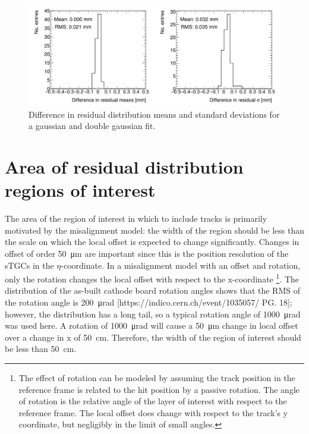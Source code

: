 \begin{figure}
    \centering
    \includegraphics[width = \textwidth]{figures/figure_compare_residual_fits_QL2C04_2900V_2021-02-08_2_fit_range_mean_pm_RMS_minus_quick_and_dirty_2900V_log_scale_layer1_fixedlayers34.png}
    \caption{Difference in residual distribution means and standard deviations for a gaussian and double gaussian fit.}
    \label{fig:double_gaussian_compare_fits}
\end{figure}

\section{Area of residual distribution regions of interest}
\label{appendix:systematics_bin_size}


The area of the region of interest in which to include tracks is primarily motivated by the misalignment model: the width of the region should be less than the scale on which the local offset is expected to change significantly. Changes in offset of order \SI{50}{\micro\meter} are important since this is the position resolution of the sTGCs in the $\eta$-coordinate. In a misalignment model with an offset and rotation, only the rotation changes the local offset with respect to the x-coordinate \footnote{The effect of rotation can be modeled by assuming the track position in the reference frame is related to the hit position by a passive rotation. The angle of rotation is the relative angle of the layer of interest with respect to the reference frame. The local offset does change with respect to the track's y coordinate, but negligibly in the limit of small angles.}.  The distribution of the as-built cathode board rotation angles shows that the RMS of the rotation angle is \SI{200}{\micro\radian} [https://indico.cern.ch/event/1035057/ PG. 18]; however, the distribution has a long tail, so a typical rotation angle of \SI{1000}{\micro\radian} was used here. A rotation of \SI{1000}{\micro\radian} will cause a \SI{50}{\micro\meter} change in local offset over a change in x of \SI{50}{\centi\meter}. Therefore, the width of the region of interest should be less than \SI{50}{\centi\meter}.

